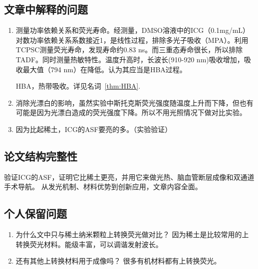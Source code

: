 \documentclass[cn,11pt,chinese]{elegantbook}
\begin{document}
\subsection{文章中解释的问题}
 \begin{enumerate}[itemsep=1.5ex]
   \item {}
   测量功率依赖关系和荧光寿命。经测量，DMSO溶液中的ICG（0.1mg/mL）对数功率依赖关系系数接近1，是线性过程，排除多光子吸收（MPA）。利用TCPSC测量荧光寿命，发现寿命约0.83 ns。而三重态寿命很长，所以排除TADF。同时测量热敏特性。温度升高时，长波长(910-920 nm)吸收增加，吸收最大值（794 nm）在降低。认为其应当是HBA过程。
   \begin{note}
     HBA，热带吸收。详见名词~\vref{thm:HBA}.
   \end{note}
   \item {}
   消除光漂白的影响，虽然实验中斯托克斯荧光强度随温度上升而下降，但也有可能是因为光漂白造成的荧光强度下降。所以不用光照情况下做对比实验。
   \item {}
  因为比起稀土，ICG的ASF要亮的多。（实验验证）


 \end{enumerate} 

\subsection{论文结构完整性}
验证ICG的ASF，证明它比稀土更亮，并用它来做光热、脑血管断层成像和双通道手术导航。
从发光机制、材料优势到创新应用，文章内容全面。

\subsection{个人保留问题}

\begin{enumerate}
  \item 为什么文中只与稀土纳米颗粒上转换荧光做对比？
  因为稀土是比较常用的上转换荧光材料。能级丰富，可以调谐发射波长。
  \item 还有其他上转换材料用于成像吗？
很多有机材料都有上转换荧光。
\end{enumerate}

\end{document}
